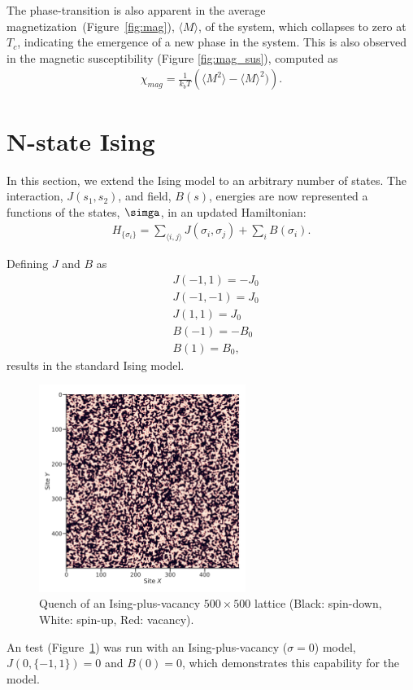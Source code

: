 \documentclass[11pt]{article}
\begin{document}
    The phase-transition is also apparent in the average magnetization~(Figure~\ref{fig:mag}), $\langle M \rangle$,
    of the system, which collapses to zero at $T_c$, indicating the emergence of a new phase in the system. This is also
    observed in the magnetic susceptibility (Figure \ref{fig:mag_sus}), computed as
    \begin{align*}
        \chi_{mag} = \frac{1}{k_b T}\left(\langle M^2 \rangle - \langle M \rangle^2)\right).
    \end{align*}

    \newpage

    \section*{N-state Ising}
    In this section, we extend the Ising model to an arbitrary number of states.
    The interaction, $J(s_1, s_2)$, and field, $B(s)$, energies are now represented a functions of the states, $\simga$,
    in an updated Hamiltonian:
    \begin{align*}
        H _{\{\sigma_i\}}= \sum_{\langle i,j \rangle} J(\sigma_i, \sigma_j) + \sum_i B(\sigma_i).
    \end{align*}

    Defining $J$ and $B$ as
    \begin{align*}
        &J(-1, 1) = -J_0 \\
        &J(-1, -1) = J_0 \\
        &J(1, 1) = J_0 \\
        &B(-1) = -B_0 \\
        &B(1) = B_0,
    \end{align*} results in the standard Ising model. \\


    \begin{figure}
        \centering
        \includegraphics[width=0.6\textwidth]{../Python/grid.pdf}

        \caption{Quench of an Ising-plus-vacancy $500 \times 500$ lattice
            (Black: spin-down, White: spin-up, Red: vacancy).}
        \label{fig:grid}
    \end{figure}

    An test (Figure~\ref{fig:grid}) was run with an Ising-plus-vacancy
    ($\sigma = 0$) model, $J(0, \{-1, 1\}) = 0$ and $B(0) = 0$,
    which demonstrates this capability for the model.

    \medskip

    \printbibliography
\end{document}
